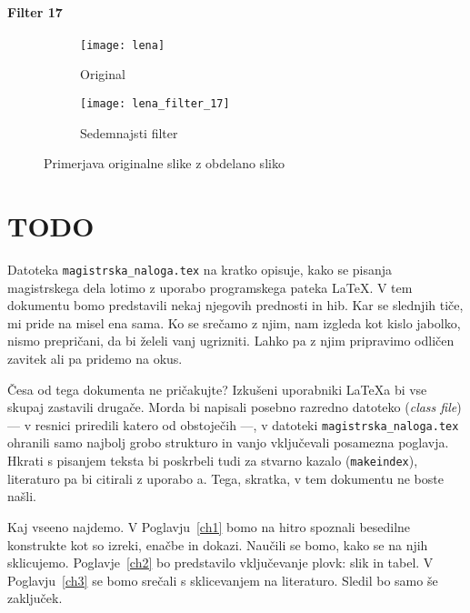 \subsubsection*{Filter 17}
\begin{figure}[h]
    \centering
    \begin{subfigure}[b]{0.4\textwidth}
        \texttt{[image: lena]}
        \caption{Original}
    \end{subfigure}
    \begin{subfigure}[b]{0.4\textwidth}
        \texttt{[image: lena\_filter\_17]}
        \caption{Sedemnajsti filter}
    \end{subfigure}
    \caption{Primerjava originalne slike z obdelano sliko}
    \label{fig:lena_filter_17}
\end{figure}

\chapter{TODO}
Datoteka {\tt magistrska\_naloga.tex} na kratko opisuje, kako se pisanja
magistrskega dela lotimo z uporabo programskega pateka \LaTeX. V tem dokumentu
bomo predstavili nekaj njegovih prednosti in hib. Kar se slednjih tiče, mi
pride na misel ena sama. Ko se srečamo z njim, nam izgleda kot kislo jabolko,
nismo prepričani, da bi želeli vanj ugrizniti. Lahko pa z njim pripravimo
odličen zavitek ali pa pridemo na okus.

Česa od tega dokumenta ne pričakujte? Izkušeni uporabniki \LaTeX{}a bi vse
skupaj zastavili drugače. Morda bi napisali posebno razredno datoteko
(\emph{class file}) --- v resnici priredili katero od obstoječih ---, v
datoteki {\tt magistrska\_naloga.tex} ohranili samo najbolj grobo strukturo in
vanjo vključevali  posamezna po\-glav\-ja. Hkrati s pisanjem teksta bi
poskrbeli tudi za stvarno kazalo ({\tt makeindex}), literaturo pa bi citirali
z uporabo {\BibTeX}{a}. Tega, skratka, v tem dokumentu ne boste našli.

Kaj vseeno najdemo. V Poglavju~\ref{ch1} bomo na hitro spoznali besedilne
konstrukte kot so izreki, enačbe in dokazi. Naučili se bomo, kako se na njih
sklicujemo. Poglavje~\ref{ch2} bo predstavilo vključevanje plovk: slik in
tabel. V Poglavju~\ref{ch3} se bomo srečali s sklicevanjem na literaturo.
Sledil bo samo še zaključek.

